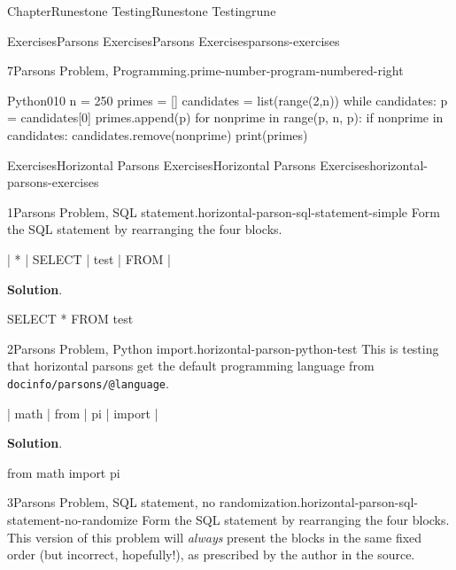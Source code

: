 \documentclass[oneside,10pt,]{book}
\newcommand{\blocktitlefont}{\relax}
\newcommand{\mono}[1]{\texttt{#1}}
\numberwithin{equation}{section}
\begin{document}
\begin{chapterptx}{Chapter}{Runestone Testing}{}{Runestone Testing}{}{}{rune}
\begin{exercises-section}{Exercises}{Parsons Exercises}{}{Parsons Exercises}{}{}{parsons-exercises}
\begin{divisionexercise}{7}{Parsons Problem, Programming.}{}{prime-number-program-numbered-right}
\begin{program}{Python}{0}{1}{0}
n = 250
primes = []
candidates = list(range(2,n))
while candidates:
    p = candidates[0]
    primes.append(p)
    for nonprime in range(p, n, p):
        if nonprime in candidates:
            candidates.remove(nonprime)
print(primes)
\end{program}
\end{divisionexercise}%
\end{exercises-section}
%
%
\typeout{************************************************}
\typeout{************************************************}
%
\begin{exercises-section}{Exercises}{Horizontal Parsons Exercises}{}{Horizontal Parsons Exercises}{}{}{horizontal-parsons-exercises}
\begin{divisionexercise}{1}{Parsons Problem, SQL statement.}{}{horizontal-parson-sql-statement-simple}%
Form the SQL statement by rearranging the four blocks.%
\par
%
\begin{codedisplay}
 | * | SELECT | test | FROM | 
\end{codedisplay}
%
\par\smallskip%
\noindent\textbf{\blocktitlefont Solution}.\hypertarget{horizontal-parson-sql-statement-simple-3}{}\quad{}%
\begin{codedisplay}
SELECT * FROM test
\end{codedisplay}
%
\end{divisionexercise}%
\begin{divisionexercise}{2}{Parsons Problem, Python import.}{}{horizontal-parson-python-test}%
This is testing that horizontal parsons get the default programming language from \mono{docinfo/parsons/@language}.%
\par
%
\begin{codedisplay}
 | math | from | pi | import | 
\end{codedisplay}
%
\par\smallskip%
\noindent\textbf{\blocktitlefont Solution}.\hypertarget{horizontal-parson-python-test-3}{}\quad{}%
\begin{codedisplay}
from math import pi
\end{codedisplay}
%
\end{divisionexercise}%
\begin{divisionexercise}{3}{Parsons Problem, SQL statement, no randomization.}{}{horizontal-parson-sql-statement-no-randomize}%
Form the SQL statement by rearranging the four blocks.  This version of this problem will \emph{always} present the blocks in the same fixed order (but incorrect, hopefully!), as prescribed by the author in the source.%

\end{divisionexercise}
\end{exercises-section}
\end{chapterptx}
\end{document}
